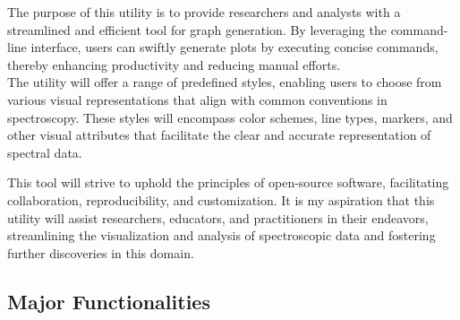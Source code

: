 \documentclass[../Master.tex]{subfiles}
\begin{document}
The purpose of this utility is to provide researchers and analysts with a streamlined and efficient tool for graph generation. By leveraging the command-line interface, users can swiftly generate plots by executing concise commands, thereby enhancing productivity and reducing manual efforts. \\
The utility will offer a range of predefined styles, enabling users to choose from various visual representations that align with common conventions in spectroscopy. These styles will encompass color schemes, line types, markers, and other visual attributes that facilitate the clear and accurate representation of spectral data.

This tool will strive to uphold the principles of open-source software, facilitating collaboration, reproducibility, and customization. It is my aspiration that this utility will assist researchers, educators, and practitioners in their endeavors, streamlining the visualization and analysis of spectroscopic data and fostering further discoveries in this domain.

\subsection{Major Functionalities}
\end{document}
